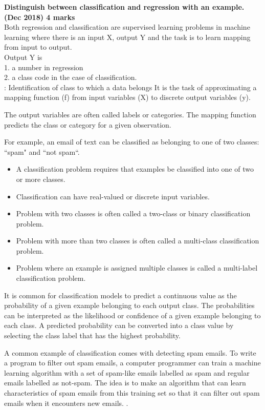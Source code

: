 
\textbf{\textcolor{LightMagenta}{Distinguish between classification and regression with an example. (Dec 2018) \hfill 4 marks}} \\[5pt]
Both regression and classification are supervised learning problems in machine learning where there is an input X, output Y and the task is to learn mapping from input to output.\\
Output Y is \\
    \hspace*{10pt} 1. a number in regression \\
    \hspace*{10pt} 2. a class code in the case of classification. \\
   
\textcolor{purple}{\underline{}}: Identification of class to which a data belongs It is the task of approximating a mapping function (f) from input variables (X) to discrete output variables (y).

The output variables are often called labels or categories. The mapping function predicts the class or category for a given observation.

For example, an email of text can be classified as belonging to one of two classes: “spam" and “not spam“.
\begin{itemize}
    \item A classification problem requires that examples be classified into one of two or more classes.
\item Classification can have real-valued or discrete input variables.
\item Problem with two classes is often called a two-class or binary classification problem.
\item Problem with more than two classes is often called a multi-class classification problem.
\item Problem where an example is assigned multiple classes is called a multi-label classification problem.
\end{itemize}
It is common for classification models to predict a continuous value as the probability of a given example belonging to each output class. The probabilities can be interpreted as the likelihood or confidence of a given example belonging to each class. A predicted probability can be converted into a class value by selecting the class label that has the highest probability.

A common example of classification comes with detecting spam emails. To write a program to filter out spam emails, a computer programmer can train a machine learning algorithm with a set of spam-like emails labelled as spam and regular emails labelled as not-spam. The idea is to make an algorithm that can learn characteristics of spam emails from this training set so that it can filter out spam emails when it encounters new emails. .

